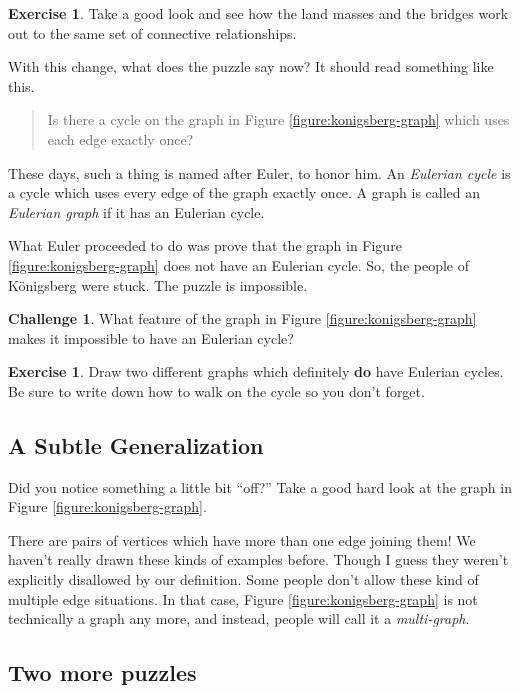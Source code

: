 \documentclass[12pt,letterpaper]{article}
\theoremstyle{definition}
\newtheorem{exercise}[question]{Exercise}
\newtheorem*{challenge}{Challenge}
\begin{document}
\begin{exercise}
Take a good look and see how the land masses and the bridges work out to the same set of connective 
relationships.
\end{exercise}

With this change, what does the puzzle say now? It should read something like this.
\begin{quote}
Is there a cycle on the graph in Figure \ref{figure:konigsberg-graph} which uses each edge exactly once?
\end{quote}

These days, such a thing is named after Euler, to honor him. An \emph{Eulerian cycle} is a cycle which uses every
edge of the graph exactly once. A graph is called an \emph{Eulerian graph} if it has an Eulerian cycle.

What Euler proceeded to do was prove that the graph in Figure \ref{figure:konigsberg-graph} does not have
an Eulerian cycle. So, the people of K\"{o}nigsberg were stuck. The puzzle is impossible.

\begin{challenge}
What feature of the graph in Figure \ref{figure:konigsberg-graph} makes it impossible to have an
Eulerian cycle?
\end{challenge}

\begin{exercise}
Draw two different graphs which definitely \textbf{do} have Eulerian cycles.
Be sure to write down how to walk on the cycle so you don't forget.
\end{exercise}


\subsection*{A Subtle Generalization}

Did you notice something a little bit ``off?'' Take a good hard look at the graph in Figure \ref{figure:konigsberg-graph}. 

There are pairs of vertices which have more than one edge joining them! We haven't really drawn these kinds of 
examples before. Though I guess they weren't explicitly disallowed by our definition. Some people don't allow these
kind of multiple edge situations. In that case, Figure \ref{figure:konigsberg-graph} is not technically a graph any more, and instead, people will call it a \emph{multi-graph}.

\subsection*{Two more puzzles}
\end{document}
